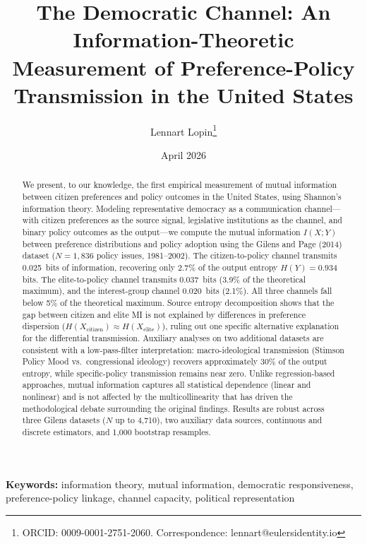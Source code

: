 \documentclass[twocolumn,10pt]{article}
\title{\textbf{The Democratic Channel: An Information-Theoretic Measurement of Preference-Policy Transmission in the United States}}
\author[1]{Lennart Lopin\thanks{ORCID: 0009-0001-2751-2060. Correspondence: lennart@eulersidentity.io}}
\affil[1]{Marscoin Foundation / Euler's Identity LLC}
\date{April 2026}
\begin{document}
\maketitle
\thispagestyle{empty}

\begin{abstract}
We present, to our knowledge, the first empirical measurement of mutual information between citizen preferences and policy outcomes in the United States, using Shannon's information theory.  Modeling representative democracy as a communication channel---with citizen preferences as the source signal, legislative institutions as the channel, and binary policy outcomes as the output---we compute the mutual information $I(X;Y)$ between preference distributions and policy adoption using the Gilens and Page (2014) dataset ($N=1{,}836$ policy issues, 1981--2002).  The citizen-to-policy channel transmits 0.025~bits of information, recovering only 2.7\% of the output entropy $H(Y) = 0.934$ bits.  The elite-to-policy channel transmits 0.037~bits (3.9\% of the theoretical maximum), and the interest-group channel 0.020~bits (2.1\%).  All three channels fall below 5\% of the theoretical maximum.  Source entropy decomposition shows that the gap between citizen and elite MI is not explained by differences in preference dispersion ($H(X_\text{citizen}) \approx H(X_\text{elite})$), ruling out one specific alternative explanation for the differential transmission.  Auxiliary analyses on two additional datasets are consistent with a low-pass-filter interpretation: macro-ideological transmission (Stimson Policy Mood vs.\ congressional ideology) recovers approximately 30\% of the output entropy, while specific-policy transmission remains near zero.  Unlike regression-based approaches, mutual information captures all statistical dependence (linear and nonlinear) and is not affected by the multicollinearity that has driven the methodological debate surrounding the original findings.  Results are robust across three Gilens datasets ($N$ up to 4,710), two auxiliary data sources, continuous and discrete estimators, and 1,000 bootstrap resamples.
\end{abstract}

\smallskip
\noindent\textbf{Keywords:} information theory, mutual information, democratic responsiveness, preference-policy linkage, channel capacity, political representation

\end{document}
